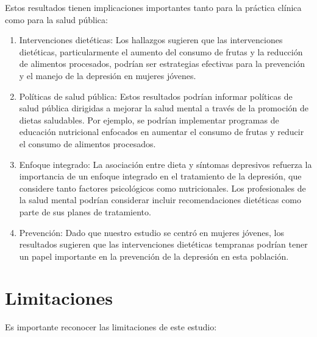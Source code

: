 \documentclass[jou]{apa7}
\begin{document}
	Estos resultados tienen implicaciones importantes tanto para la práctica
	clínica como para la salud pública:

	\begin{enumerate}
		\item Intervenciones dietéticas: Los hallazgos sugieren que las intervenciones dietéticas, particularmente el aumento del consumo de frutas y la reducción de alimentos procesados, podrían ser estrategias efectivas para la prevención y el manejo de la depresión en mujeres jóvenes.
		\item Políticas de salud pública: Estos resultados podrían informar políticas de salud pública dirigidas a mejorar la salud mental a través de la promoción de dietas saludables. Por ejemplo, se podrían implementar programas de educación nutricional enfocados en aumentar el consumo de frutas y reducir el consumo de alimentos procesados.
		\item Enfoque integrado: La asociación entre dieta y síntomas depresivos refuerza la importancia de un enfoque integrado en el tratamiento de la depresión, que considere tanto factores psicológicos como nutricionales. Los profesionales de la salud mental podrían considerar incluir recomendaciones dietéticas como parte de sus planes de tratamiento.
		\item Prevención: Dado que nuestro estudio se centró en mujeres jóvenes, los resultados sugieren que las intervenciones dietéticas tempranas podrían tener un papel importante en la prevención de la depresión en esta población.
	\end{enumerate}


	\section{Limitaciones}\label{limitaciones}

	Es importante reconocer las limitaciones de este estudio:
\end{document}
